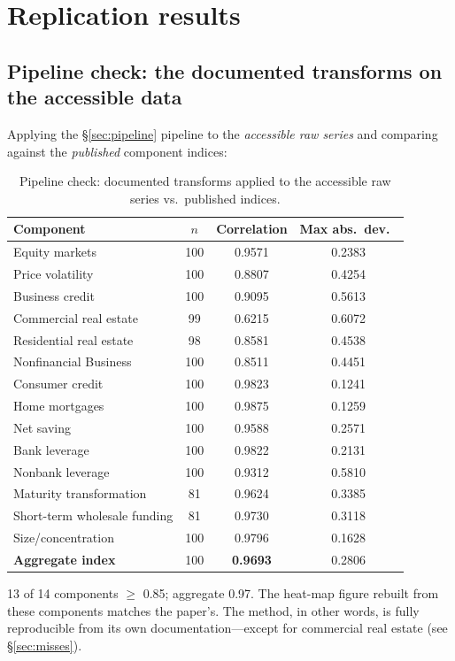 \documentclass[11pt]{article}
\begin{document}
\section{Replication results}
\label{sec:results}

\subsection{Pipeline check: the documented transforms on the accessible data}
\label{sec:results-pipeline}

Applying the \S\ref{sec:pipeline} pipeline to the \textit{accessible raw
series} and comparing against the \textit{published} component indices:

\begin{table}[h]
\centering
\caption{Pipeline check: documented transforms applied to the accessible
raw series vs.\ published indices.}
\label{tab:pipeline}
\begin{tabular}{lccc}
\toprule
Component & $n$ & Correlation & Max abs.\ dev.\ \\
\midrule
Equity markets & 100 & 0.9571 & 0.2383 \\
Price volatility & 100 & 0.8807 & 0.4254 \\
Business credit & 100 & 0.9095 & 0.5613 \\
Commercial real estate & 99 & 0.6215 & 0.6072 \\
Residential real estate & 98 & 0.8581 & 0.4538 \\
Nonfinancial Business & 100 & 0.8511 & 0.4451 \\
Consumer credit & 100 & 0.9823 & 0.1241 \\
Home mortgages & 100 & 0.9875 & 0.1259 \\
Net saving & 100 & 0.9588 & 0.2571 \\
Bank leverage & 100 & 0.9822 & 0.2131 \\
Nonbank leverage & 100 & 0.9312 & 0.5810 \\
Maturity transformation & 81 & 0.9624 & 0.3385 \\
Short-term wholesale funding & 81 & 0.9730 & 0.3118 \\
Size/concentration & 100 & 0.9796 & 0.1628 \\
\midrule
\textbf{Aggregate index} & 100 & \textbf{0.9693} & 0.2806 \\
\bottomrule
\end{tabular}
\end{table}

13 of 14 components $\ge$ 0.85; aggregate 0.97.  The heat-map figure
rebuilt from these components matches the paper's.  The method, in other
words, is fully reproducible from its own documentation---except for
commercial real estate (see \S\ref{sec:misses}).
\end{document}
